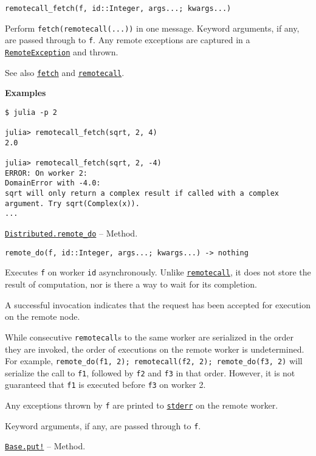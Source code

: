 \begin{adjustwidth}{2em}{0pt}


\begin{verbatim}
remotecall_fetch(f, id::Integer, args...; kwargs...)
\end{verbatim}

Perform \texttt{fetch(remotecall(...))} in one message. Keyword arguments, if any, are passed through to \texttt{f}. Any remote exceptions are captured in a \hyperlink{10250718604436154991}{\texttt{RemoteException}} and thrown.

See also \hyperlink{11007884648860062495}{\texttt{fetch}} and \hyperlink{5405028821457292937}{\texttt{remotecall}}.

\textbf{Examples}


\begin{verbatim}
$ julia -p 2

julia> remotecall_fetch(sqrt, 2, 4)
2.0

julia> remotecall_fetch(sqrt, 2, -4)
ERROR: On worker 2:
DomainError with -4.0:
sqrt will only return a complex result if called with a complex argument. Try sqrt(Complex(x)).
...
\end{verbatim}



\end{adjustwidth}
\hypertarget{11057633401302866521}{}
\hyperlink{11057633401302866521}{\texttt{Distributed.remote\_do}}  -- {Method.}

\begin{adjustwidth}{2em}{0pt}


\begin{verbatim}
remote_do(f, id::Integer, args...; kwargs...) -> nothing
\end{verbatim}

Executes \texttt{f} on worker \texttt{id} asynchronously. Unlike \hyperlink{5405028821457292937}{\texttt{remotecall}}, it does not store the result of computation, nor is there a way to wait for its completion.

A successful invocation indicates that the request has been accepted for execution on the remote node.

While consecutive \texttt{remotecall}s to the same worker are serialized in the order they are invoked, the order of executions on the remote worker is undetermined. For example, \texttt{remote\_do(f1, 2); remotecall(f2, 2); remote\_do(f3, 2)} will serialize the call to \texttt{f1}, followed by \texttt{f2} and \texttt{f3} in that order. However, it is not guaranteed that \texttt{f1} is executed before \texttt{f3} on worker 2.

Any exceptions thrown by \texttt{f} are printed to \hyperlink{6150355911915549172}{\texttt{stderr}} on the remote worker.

Keyword arguments, if any, are passed through to \texttt{f}.



\end{adjustwidth}
\hypertarget{10528364827478850064}{}
\hyperlink{10528364827478850064}{\texttt{Base.put!}}  -- {Method.}

